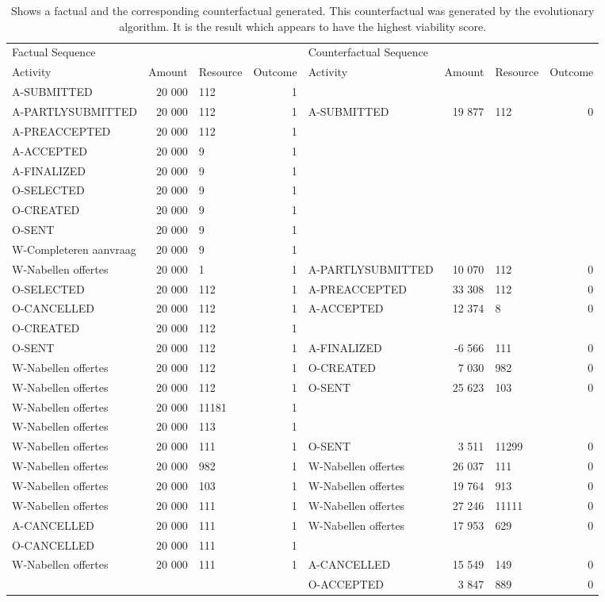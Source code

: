 \begin{table}
\caption{Shows a factual and the corresponding counterfactual generated. This counterfactual was generated by the evolutionary algorithm. It is the result which appears to have the highest viability score.}
\label{tbl:example-cf-evo}
\begin{tabular}{lrlrlrlr}
\toprule
\multicolumn{4}{l}{Factual Sequence} & \multicolumn{4}{l}{Counterfactual Sequence} \\
Activity & Amount & Resource & Outcome & Activity & Amount & Resource & Outcome \\
\midrule
A-SUBMITTED & 20 000 & 112 & 1 &  &  &  &  \\
A-PARTLYSUBMITTED & 20 000 & 112 & 1 & A-SUBMITTED & 19 877 & 112 & 0 \\
A-PREACCEPTED & 20 000 & 112 & 1 &  &  &  &  \\
A-ACCEPTED & 20 000 & 9 & 1 &  &  &  &  \\
A-FINALIZED & 20 000 & 9 & 1 &  &  &  &  \\
O-SELECTED & 20 000 & 9 & 1 &  &  &  &  \\
O-CREATED & 20 000 & 9 & 1 &  &  &  &  \\
O-SENT & 20 000 & 9 & 1 &  &  &  &  \\
W-Completeren aanvraag & 20 000 & 9 & 1 &  &  &  &  \\
W-Nabellen offertes & 20 000 & 1 & 1 & A-PARTLYSUBMITTED & 10 070 & 112 & 0 \\
O-SELECTED & 20 000 & 112 & 1 & A-PREACCEPTED & 33 308 & 112 & 0 \\
O-CANCELLED & 20 000 & 112 & 1 & A-ACCEPTED & 12 374 & 8 & 0 \\
O-CREATED & 20 000 & 112 & 1 &  &  &  &  \\
O-SENT & 20 000 & 112 & 1 & A-FINALIZED & -6 566 & 111 & 0 \\
W-Nabellen offertes & 20 000 & 112 & 1 & O-CREATED & 7 030 & 982 & 0 \\
W-Nabellen offertes & 20 000 & 112 & 1 & O-SENT & 25 623 & 103 & 0 \\
W-Nabellen offertes & 20 000 & 11181 & 1 &  &  &  &  \\
W-Nabellen offertes & 20 000 & 113 & 1 &  &  &  &  \\
W-Nabellen offertes & 20 000 & 111 & 1 & O-SENT & 3 511 & 11299 & 0 \\
W-Nabellen offertes & 20 000 & 982 & 1 & W-Nabellen offertes & 26 037 & 111 & 0 \\
W-Nabellen offertes & 20 000 & 103 & 1 & W-Nabellen offertes & 19 764 & 913 & 0 \\
W-Nabellen offertes & 20 000 & 111 & 1 & W-Nabellen offertes & 27 246 & 11111 & 0 \\
A-CANCELLED & 20 000 & 111 & 1 & W-Nabellen offertes & 17 953 & 629 & 0 \\
O-CANCELLED & 20 000 & 111 & 1 &  &  &  &  \\
W-Nabellen offertes & 20 000 & 111 & 1 & A-CANCELLED & 15 549 & 149 & 0 \\
 &  &  &  & O-ACCEPTED & 3 847 & 889 & 0 \\
\bottomrule
\end{tabular}
\end{table}
